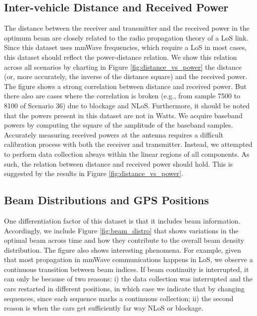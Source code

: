 \documentclass[10pt,comsoc]{IEEEtran}
\begin{document}
\vspace{.1cm}
\subsection{Inter-vehicle Distance and Received Power} \label{subsec:distance_vs_receivepower}

The distance between the receiver and transmitter and the received power in the optimum beam are closely related to the radio propagation theory of a LoS link. Since this dataset uses mmWave frequencies, which require a LoS in most cases, this dataset should reflect the power-distance relation. We show this relation across all scenarios by charting in Figure \ref{fig:distance_vs_power} the distance (or, more accurately, the inverse of the distance square) and the received power. The figure shows a strong correlation between distance and received power. But there also are cases where the correlation is broken (e.g., from sample 7500 to 8100 of Scenario 36) due to blockage and NLoS. Furthermore, it should be noted that the powers present in this dataset are not in Watts. We acquire baseband powers by computing the square of the amplitude of the baseband samples. Accurately measuring received powers at the antenna requires a difficult calibration process with both the receiver and transmitter. Instead, we attempted to perform data collection always within the linear regions of all components. As such, the relation between distance and received power should hold. This is suggested by the results in Figure \ref{fig:distance_vs_power}.



\subsection{Beam Distributions and GPS Positions} \label{subsec:beam_distributions}

One differentiation factor of this dataset is that it includes beam information. Accordingly, we include Figure \ref{fig:beam_distro} that shows variations in the optimal beam across time and how they contribute to the overall beam density distribution. The figure also shows interesting phenomena. For example, given that most propagation in mmWave communications happens in LoS, we observe a continuous transition between beam indices. If beam continuity is interrupted, it can only be because of two reasons: i) the data collection was interrupted and the cars restarted in different positions, in which case we indicate that by changing sequences, since each sequence marks a continuous collection; ii) the second reason is when the cars get sufficiently far way NLoS or blockage. 
\end{document}
